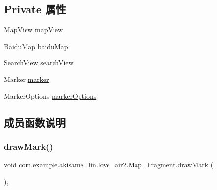 \subsection*{Private 属性}
\begin{DoxyCompactItemize}
\item 
Map\+View \mbox{\hyperlink{classcom_1_1example_1_1akisame__lin_1_1love__air2_1_1_map___fragment_aff8125f626155888254ca609e9e69d3e}{map\+View}}
\item 
Baidu\+Map \mbox{\hyperlink{classcom_1_1example_1_1akisame__lin_1_1love__air2_1_1_map___fragment_adfafdede345963901fa86dd4c338f31f}{baidu\+Map}}
\item 
Search\+View \mbox{\hyperlink{classcom_1_1example_1_1akisame__lin_1_1love__air2_1_1_map___fragment_a8a37cb1ee8f1fd25df04a292ccfdacc3}{search\+View}}
\item 
Marker \mbox{\hyperlink{classcom_1_1example_1_1akisame__lin_1_1love__air2_1_1_map___fragment_a9ef68b1f714e7f584030ac5d146df2dd}{marker}}
\item 
Marker\+Options \mbox{\hyperlink{classcom_1_1example_1_1akisame__lin_1_1love__air2_1_1_map___fragment_ac988e772215c51ed5285a871d320dc5a}{marker\+Options}}
\end{DoxyCompactItemize}


\subsection{成员函数说明}
\mbox{\label{classcom_1_1example_1_1akisame__lin_1_1love__air2_1_1_map___fragment_a027a603af0817d6d6a58491a001af6d5}} 
\subsubsection{\texorpdfstring{drawMark()}{drawMark()}}
{\footnotesize\ttfamily void com.\+example.\+akisame\+\_\+lin.\+love\+\_\+air2.\+Map\+\_\+\+Fragment.\+draw\+Mark (\begin{DoxyParamCaption}{ }\end{DoxyParamCaption})\hspace{0.3cm}{\ttfamily [inline]}, {\ttfamily [private]}}

